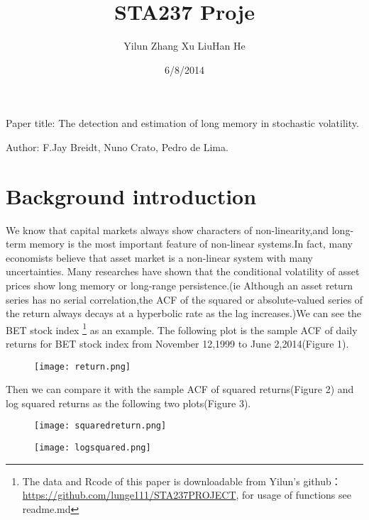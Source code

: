 \documentclass[10pt,a4paper]{article}
\title{\huge STA237 Proje}
\date{6/8/2014}
\author[1]{Yilun Zhang \qquad  Xu Liu\qquad Han He}
\begin{document}
\maketitle
\begin{center} Paper title: The detection and estimation of long memory in stochastic volatility.\end{center}

\begin{center} Author: F.Jay Breidt, Nuno Crato, Pedro de Lima.\end{center}

\section{Background introduction}

We know that capital markets always show characters of non-linearity,and long-term memory is the most important feature of non-linear systems.In fact, many economists believe that asset market is a non-linear system with many uncertainties. Many researches have shown that the conditional volatility of asset prices show long memory or long-range persistence.(ie Although an asset return series has no serial correlation,the ACF of the squared or absolute-valued series of the return always decays at a hyperbolic rate as the lag increases.)We can see the BET stock index  \footnote[1]{The data and Rcode of this paper is downloadable from Yilun's github： \url{https://github.com/lunge111/STA237PROJECT}, for usage of functions see readme.md} as an example. The following plot is the sample ACF of daily returns for BET stock index from November 12,1999 to June 2,2014(Figure 1).

\begin{figure}[!htb]
\centering
\texttt{[image: return.png]}
\caption{}
\end{figure}

Then we can compare it with the sample ACF of squared returns(Figure 2) and log squared returns as the following two plots(Figure 3).

\begin{figure}[!htb]
\centering
\texttt{[image: squaredreturn.png]}
\caption{}
\end{figure}

\begin{figure}[!htb]
\centering
\texttt{[image: logsquared.png]}
\caption{}
\end{figure}
\end{document}
